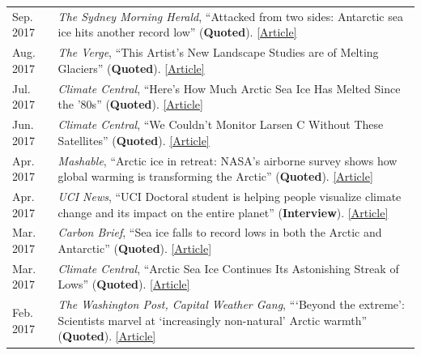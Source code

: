 \documentclass[margin,line,palatino,courier,10pt]{res}
\begin{document}
\begin{resume}
\begin{tabular}{@{}p{0.9in}p{4in}}
Sep. 2017 & \textit{The Sydney Morning Herald}, ``Attacked from two sides: Antarctic sea ice hits another record low'' (\textbf{Quoted}). \href{http://www.smh.com.au/environment/climate-change/attacked-from-two-sides-antarctic-sea-ice-hits-another-record-low-20170926-gyouuc.html}{[Article]}\\
Aug. 2017 & \textit{The Verge}, ``This Artist's New Landscape Studies are of Melting Glaciers'' (\textbf{Quoted}). \href{http://sites.uci.edu/zlabe/media-and-outreach/?preview_id=567&preview_nonce=d7dd77fe7a&_thumbnail_id=-1&preview=true}{[Article]}\\
Jul. 2017 & \textit{Climate Central}, ``Here's How Much Arctic Sea Ice Has Melted Since the '80s'' (\textbf{Quoted}). \href{http://www.climatecentral.org/news/arctic-sea-ice-melt-since-the-80s-21637}{[Article]}\\
Jun. 2017 & \textit{Climate Central}, ``We Couldn't Monitor Larsen C Without These Satellites'' (\textbf{Quoted}). \href{http://www.climatecentral.org/news/larsen-c-monitoring-satellites-21564}{[Article]}\\
Apr. 2017 & \textit{Mashable}, ``Arctic ice in retreat: NASA's airborne survey shows how global warming is transforming the Arctic'' (\textbf{Quoted}). \href{http://mashable.com/2017/04/13/arctic-meltdown-nasa-photos-changing-ice/?utm_cid=hp-n-1#BgdepWyM6Pq3}{[Article]}\\
Apr. 2017 & \textit{UCI News}, ``UCI Doctoral student is helping people visualize climate change and its impact on the entire planet'' (\textbf{Interview}). \href{http://grad.uci.edu/news-and-events/student-spotlights/Zachary-Labe.html}{[Article]}\\
Mar. 2017 & \textit{Carbon Brief}, ``Sea ice falls to record lows in both the Arctic and Antarctic'' (\textbf{Quoted}). \href{https://www.carbonbrief.org/sea-ice-falls-record-lows-arctic-antarctic}{[Article]}\\
Mar. 2017 & \textit{Climate Central}, ``Arctic Sea Ice Continues Its Astonishing Streak of Lows'' (\textbf{Quoted}). \href{http://www.climatecentral.org/news/arctic-sea-ice-record-low-streak-21227}{[Article]}\\
Feb. 2017 & \textit{The Washington Post, Capital Weather Gang}, ```Beyond the extreme': Scientists marvel at `increasingly non-natural' Arctic warmth'' (\textbf{Quoted}). \href{https://www.washingtonpost.com/news/capital-weather-gang/wp/2017/02/01/beyond-the-extreme-scientists-marvel-at-increasingly-non-natural-arctic-warmth/?sdfsdfsdfsdfsd&utm_term=.cf3cf81d24f3}{[Article]}\\

\end{tabular}
\end{resume}
\end{document}
